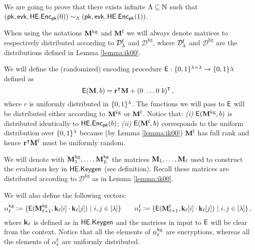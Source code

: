 We are going to prove that there exists infinite $\Lambda \subseteq \mathbb{N}$ such that $(\mathsf{pk},\mathsf{evk}, \mathsf{HE.Enc}_{\mathsf{pk}}(0)) \sim_{\Lambda} (\mathsf{pk},\mathsf{evk}, \mathsf{HE.Enc}_{\mathsf{pk}}(1))$.

When using the notations $\mathbf{M}^{\text{kg}}$ and $\mathbf{M}^{\mathcal{\text{f}}}$ we will always denote matrices to respectively distributed according to $\mathcal{D}^{\text{f}}_{\lambda}$ and  $\mathcal{D}^{\text{kg}}$, where $\mathcal{D}^{\text{f}}_{\lambda}$ and $\mathcal{D}^{\text{kg}}$ are the distributions defined in Lemma \ref{lemma:ik00}.



We will define the (randomized) encoding procedure $\mathsf{E} : \{0, 1\}^{\lambda \times \lambda} \to \{0, 1\}{\lambda}$ defined as 
\[
    \mathsf{E}(\mathbf{M}, b) = {\mathbf{r}}^{\intercal} \mathbf{M} + {(0 \ \dots 0 \ b)}^{\intercal} \, ,
\]
where $r$ is uniformly distributed in $\{0, 1\}^{\lambda}$. The functions we will pass to $\mathsf{E}$ will be distributed either according to $\mathbf{M}^{\text{kg}}$ or $\mathbf{M}^{\mathcal{\text{f}}}$. Notice that: \textit{(i)}  $\mathsf{E}(\mathbf{M}^{\text{kg}}, b)$ is distributed identically to $\mathsf{HE.Enc}_{\mathsf{pk}}(b)$; \textit{(ii)} $\mathsf{E}(\mathbf{M}^{\mathcal{\text{f}}}, b)$ corresponds to the uniform distribution over $\{0, 1\}^{\lambda}$ because (by Lemma \ref{lemma:ik00}) $\mathbf{M}^{\mathcal{\text{f}}}$ has full rank and hence ${\mathbf{r}}^{\intercal}\mathbf{M}^{\mathcal{\text{f}}}$ must be uniformly random.

We will denote with $\mathbf{M}^{\text{kg}}_1, \dots, \mathbf{M}^{\text{kg}}_{L}$  the matrices $\mathbf{M}_1, \dots, \mathbf{M}_{\ell}$ used to construct the evaluation key in $\mathsf{HE.Keygen}$ (see definition). Recall these matrices are distributed according to $\mathcal{D}^{\text{kg}}$ as in Lemma \ref{lemma:ik00}.

We will also define the following vectors:
\[
\mathbf{\alpha}^{\text{kg}}_{\ell} \vcentcolon= \{ \mathsf{E}(\mathbf{M}^{\text{kg}}_{\ell+1}, \mathbf{k}_{\ell}[i] \cdot \mathbf{k}_{\ell}[j]) \ | \ i,j \in [\lambda] \} \qquad \mathbf{\alpha}^{\text{f}}_{\ell} \vcentcolon= \{ \mathsf{E}(\mathbf{M}^{\mathcal{\text{f}}}_{\ell+1}, \mathbf{k}_{\ell}[i] \cdot \mathbf{k}_{\ell}[j]) \ | \ i,j \in [\lambda] \} \, ,
\]
where $\mathbf{k}_{\ell}$ is defined as in $\mathsf{HE.Keygen}$ and the matrices in input to $\mathsf{E}$ will be clear from the context. Notice that all the elements of $\mathbf{\alpha}^{\text{kg}}_{\ell}$ are encryptions, whereas all the elements of $\mathbf{\alpha}^{\text{f}}_{\ell}$ are uniformly distributed.

